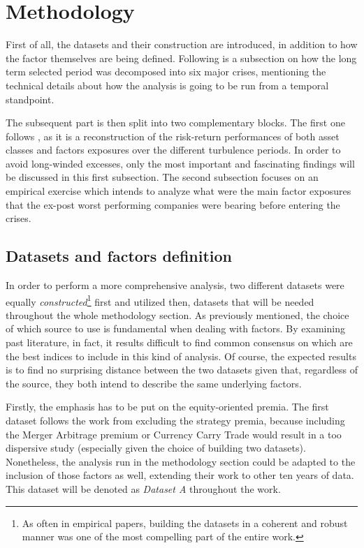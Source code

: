 \documentclass[12pt]{article}
\begin{document}


\newpage
\section{Methodology} \label{section:4}
First of all, the datasets and their construction are introduced, in addition to how the factor themselves are being defined. Following is a subsection on how the long term selected period was decomposed into six major crises, mentioning the technical details about how the analysis is going to be run from a temporal standpoint.

The subsequent part is then split into two complementary blocks. The first one follows , as it is a reconstruction of the risk-return performances of both asset classes and factors exposures over the different turbulence periods. In order to avoid long-winded excesses, only the most important and fascinating findings will be discussed in this first subsection. The second subsection focuses on an empirical exercise which intends to analyze what were the main factor exposures that the ex-post worst performing companies were bearing before entering the crises.

\subsection{Datasets and factors definition} \label{factors_definitions_dataset}
In order to perform a more comprehensive analysis, two different datasets were equally \textit{constructed}\footnote{As often in empirical papers, building the datasets in a coherent and robust manner was one of the most compelling part of the entire work.} first and utilized then, datasets that will be needed throughout the whole methodology section. As previously mentioned, the choice of which source to use is fundamental when dealing with factors. By examining past literature, in fact, it results difficult to find common consensus on which are the best indices to include in this kind of analysis. Of course, the expected results is to find no surprising distance between the two datasets given that, regardless of the source, they both intend to describe the same underlying factors.

Firstly, the emphasis has to be put on the equity-oriented premia. The first dataset follows the work from  excluding the strategy premia, because including the Merger Arbitrage premium or Currency Carry Trade would result in a too dispersive study (especially given the choice of building two datasets). Nonetheless, the analysis run in the methodology section could be adapted to the inclusion of those factors as well, extending their work to other ten years of data. This dataset will be denoted as \textit{Dataset A} throughout the work.
\end{document}
